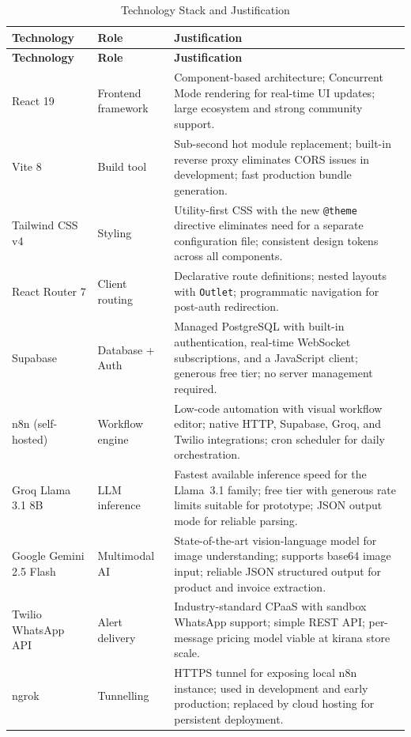 {\singlespacing
\renewcommand{\arraystretch}{1.5}
\begin{longtable}{@{} >{\raggedright\arraybackslash}p{3.5cm} >{\raggedright\arraybackslash}p{2.5cm} >{\raggedright\arraybackslash}p{8.5cm} @{}}
\caption{Technology Stack and Justification}
\label{tab:stack} \\
\toprule
\textbf{Technology} & \textbf{Role} & \textbf{Justification} \\
\midrule
\endfirsthead
\toprule
\textbf{Technology} & \textbf{Role} & \textbf{Justification} \\
\midrule
\endhead
\bottomrule
\endfoot
React 19 & Frontend framework &
  Component-based architecture; Concurrent Mode rendering for real-time UI updates;
  large ecosystem and strong community support. \\
Vite 8 & Build tool &
  Sub-second hot module replacement; built-in reverse proxy eliminates CORS issues
  in development; fast production bundle generation. \\
Tailwind CSS v4 & Styling &
  Utility-first CSS with the new \texttt{@theme} directive eliminates need for a
  separate configuration file; consistent design tokens across all components. \\
React Router 7 & Client routing &
  Declarative route definitions; nested layouts with \texttt{Outlet}; programmatic
  navigation for post-auth redirection. \\
Supabase & Database + Auth &
  Managed PostgreSQL with built-in authentication, real-time WebSocket subscriptions,
  and a JavaScript client; generous free tier; no server management required. \\
n8n (self-hosted) & Workflow engine &
  Low-code automation with visual workflow editor; native HTTP, Supabase, Groq,
  and Twilio integrations; cron scheduler for daily orchestration. \\
Groq Llama 3.1 8B & LLM inference &
  Fastest available inference speed for the Llama~3.1 family; free tier with
  generous rate limits suitable for prototype; JSON output mode for reliable parsing. \\
Google Gemini 2.5 Flash & Multimodal AI &
  State-of-the-art vision-language model for image understanding; supports base64
  image input; reliable JSON structured output for product and invoice extraction. \\
Twilio WhatsApp API & Alert delivery &
  Industry-standard CPaaS with sandbox WhatsApp support; simple REST API; per-message
  pricing model viable at kirana store scale. \\
ngrok & Tunnelling &
  HTTPS tunnel for exposing local n8n instance; used in development and
  early production; replaced by cloud hosting for persistent deployment. \\
\end{longtable}
}

